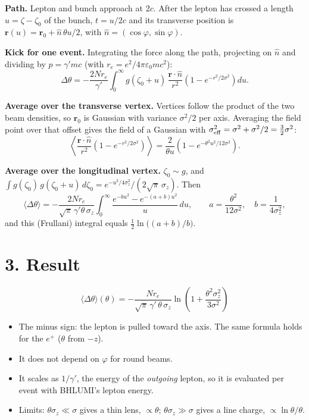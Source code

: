 \documentclass[11pt]{article}
\begin{document}
\textbf{Path.} Lepton and bunch approach at $2c$. After the lepton has crossed a length $u=\zeta-\zeta_0$ of the
bunch, $t=u/2c$ and its transverse position is $\mathbf r(u)=\mathbf r_0+\hat n\,\theta u/2$, with
$\hat n=(\cos\varphi,\sin\varphi)$.

\textbf{Kick for one event.} Integrating the force along the path, projecting on $\hat n$ and dividing by
$p=\gamma' m c$ (with $r_e=e^2/4\pi\varepsilon_0 mc^2$):
\begin{equation}
\Delta\theta=-\frac{2Nr_e}{\gamma'}\int_0^\infty g(\zeta_0+u)\,
\frac{\mathbf r\cdot\hat n}{r^2}\left(1-e^{-r^2/2\sigma^2}\right)du .
\end{equation}

\textbf{Average over the transverse vertex.} Vertices follow the product of the two beam densities, so
$\mathbf r_0$ is Gaussian with variance $\sigma^2/2$ per axis. Averaging the field point over that offset gives the
field of a Gaussian with $\sigma_{\rm eff}^2=\sigma^2+\sigma^2/2=\tfrac32\sigma^2$:
\begin{equation}
\left\langle\frac{\mathbf r\cdot\hat n}{r^2}\left(1-e^{-r^2/2\sigma^2}\right)\right\rangle
=\frac{2}{\theta u}\left(1-e^{-\theta^2u^2/12\sigma^2}\right).
\end{equation}

\textbf{Average over the longitudinal vertex.} $\zeta_0\sim g$, and
$\int g(\zeta_0)\,g(\zeta_0+u)\,d\zeta_0=e^{-u^2/4\sigma_z^2}/(2\sqrt\pi\,\sigma_z)$. Then
\begin{equation}
\langle\Delta\theta\rangle=-\frac{2Nr_e}{\sqrt\pi\,\gamma'\theta\,\sigma_z}
\int_0^\infty\frac{e^{-bu^2}-e^{-(a+b)u^2}}{u}\,du,
\qquad a=\frac{\theta^2}{12\sigma^2},\quad b=\frac{1}{4\sigma_z^2},
\end{equation}
and this (Frullani) integral equals $\tfrac12\ln\!\big((a+b)/b\big)$.

\section*{3. Result}

\begin{equation}
\boxed{\;\langle\Delta\theta\rangle(\theta)=-\frac{N r_e}{\sqrt{\pi}\,\gamma'\,\theta\,\sigma_z}
\ln\!\left(1+\frac{\theta^2\sigma_z^2}{3\sigma^2}\right)\;}
\end{equation}
\begin{itemize}
  \item The minus sign: the lepton is pulled toward the axis. The same formula holds for the $e^+$ ($\theta$ from $-z$).
  \item It does not depend on $\varphi$ for round beams.
  \item It scales as $1/\gamma'$, the energy of the \emph{outgoing} lepton, so it is evaluated per event with
        BHLUMI's lepton energy.
  \item Limits: $\theta\sigma_z\ll\sigma$ gives a thin lens, $\propto\theta$;
        $\theta\sigma_z\gg\sigma$ gives a line charge, $\propto\ln\theta/\theta$.
\end{itemize}
\end{document}
